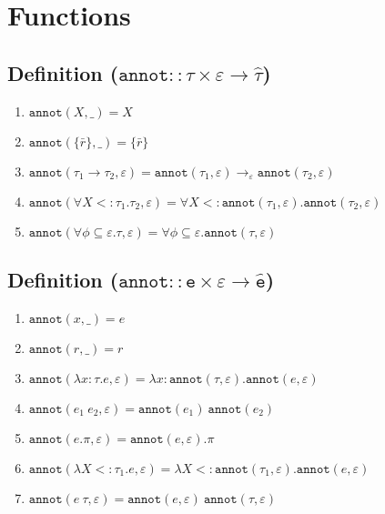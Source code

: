 \documentclass{llncs}
\newcommand{\keywadj}[1]{\mathtt{#1}}
\newcommand{\kwa}[1]{\keywadj{ #1 }}
\newcommand{\annot}[2]{
	\keywadj{annot}(#1, #2)
}
\newcommand{\poly}[2]{
	\forall #1. #2
}
\begin{document}
\section{Functions}

\subsection*{Definition ($\kwa{annot :: \tau \times \varepsilon \rightarrow \hat \tau}$)}

\begin{enumerate}
	\item $\annot{X}{\_} = X$
	\item $\annot{\{ \bar r \}}{\_} = \{ \bar r \}$
	\item $\annot{\tau_1 \rightarrow \tau_2}{\varepsilon} = \annot{\tau_1}{\varepsilon} \rightarrow_{\varepsilon} \annot{\tau_2}{\varepsilon}$
	\item $\annot{\poly{X <: \tau_1}{\tau_2}}{\varepsilon} = \poly{X <: \annot{\tau_1}{\varepsilon}}{\annot{\tau_2}{\varepsilon}}$
	\item $\annot{\poly{\phi \subseteq \varepsilon}{\tau}}{\varepsilon} = \poly{\phi \subseteq \varepsilon}{\annot{\tau}{\varepsilon}}$
\end{enumerate}


\subsection*{Definition ($\kwa{annot :: e \times \varepsilon \rightarrow \hat e}$)}

\begin{enumerate}
	\item $\kwa{annot}(x, \_) = e$
	\item $\kwa{annot}(r, \_) = r$
	\item $\kwa{annot}(\lambda x: \tau.e, \varepsilon) = \lambda x: \kwa{annot}(\tau, \varepsilon) . \kwa{annot}(e, \varepsilon)$
	\item $\kwa{annot}(e_1~e_2, \varepsilon) = \kwa{annot}(e_1)~\kwa{annot}(e_2)$
	\item $\kwa{annot}(e.\pi, \varepsilon) = \annot{e}{\varepsilon}.\pi$
	\item $\annot{\lambda X <: \tau_1. e}{\varepsilon} = \lambda X <: \annot{\tau_1}{\varepsilon}. \annot{e}{\varepsilon}$
	\item $\annot{e~\tau}{\varepsilon} = \annot{e}{\varepsilon}~\annot{\tau}{\varepsilon}$
\end{enumerate}
\end{document}

